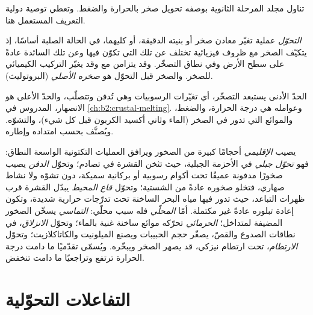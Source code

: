 تناول مجلد المرحلة الثانوية  بوصفه تحويل صخر بالحرارة
والضغط. وتعطي توصية دولية التعريف المستعمل هنا.

\begin{definition}\label{def:b2:metamorphic-facies:metamorphism}
\emph{التحوّل} عملية تغيّر معادن صخر أو
بنيته الدقيقة، أو كليهما، في الحالة الصلبة أساسًا، إذ يتكيّف الصخر
مع ظروف فيزيائية تختلف عن تلك التي تكوّن فيها وعن تلك
السائدة عادةً على سطح الأرض وفي نطاق التصخّر. وقد يتزامن مع
 وقد يغيّر التركيب الكيميائي للصخر. والصخر قبل
التحوّل هو \emph{صخره الأصلي} (البروتوليث).
\end{definition}

الحدّ الأدنى يستبعد التصخّر، أي تغيّرات الرسوبيات وهي تُدفن
وتتصلّب، والحدّ الأعلى هو الانصهار، المدروس في \cref{ch:b2:crustal-melting}.
وعوامله هي درجة الحرارة، والضغط، والموائع التي تدور في الصخر (الماء
وثاني أكسيد الكربون قبل كل شيء)، والتشوّه. ويُصنَّف  بحسب امتداده
وإطاره.

يصيب  \emph{الإقليمي} أحجامًا كبيرة من الصخور ويرافق
العمليات التكتونية الواسعة النطاق: فهو \emph{تحوّل جبلي} في الأحزمة الجبلية، حيث تثخن القشرة في
تصادم؛ وتحوّل \emph{الدفن} يصيب صخورًا مدفونة عميقًا تحت أكوام
رسوبية أو بركانية سميكة، دون تشوّه ولا نشاط صهاري، فتخلو صخوره
عادةً من الشستية؛ وتحوّل \emph{قاع المحيط} يبدّل القشرة قرب
ظهرات التباعد، حيث تدور فيها مياه البحر الساخنة تحت تدرّجات حرارية
شديدة، وتكون إعادة تبلوره عادةً غير مكتملة. أمّا  \emph{المحلّي}
فله سبب محلّي:  \emph{التماسي} يسخّن الصخور المضيفة لمتداخل؛
 \emph{الحرمائي} تحرّكه موائع ساخنة غنية بالماء؛
وتحوّل \emph{الانزلاق}، في نطاقات الصدوع والقصّ، يصغّر حجم الحبيبات
ويصنع الميلونيت والكاتاكلازيت؛ وتحوّل \emph{الارتطام}، تحت ارتطام نيزكي،
قد يصهر الصخر ويبخّره. ويُسمّى  تقدّميًا ما دامت درجة الحرارة ترتفع
وتراجعيًا ما دامت تنخفض.

\section{التفاعلات التحوّلية}\label{sec:b2:metamorphic-facies:reactions}

